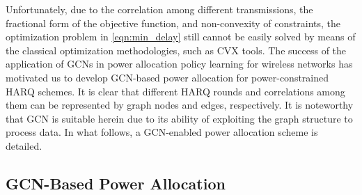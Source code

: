 \documentclass[conference]{IEEEtran}
\begin{document}
Unfortunately, due to the correlation among different transmissions, the fractional form of the objective function, and non-convexity of constraints, the optimization problem in \eqref{eqn:min_delay} still cannot be easily solved by means of the classical optimization methodologies, such as CVX tools. The success of the application of GCNs in power allocation policy learning for wireless networks \cite{9252917} has motivated us to develop GCN-based power allocation for power-constrained HARQ schemes. It is clear that different HARQ rounds and correlations among them can be represented by graph nodes and edges, respectively. %
It is noteworthy that GCN is suitable herein due to its ability of exploiting the graph structure to process data. In what follows, a GCN-enabled power allocation scheme is detailed.
\subsection{GCN-Based Power Allocation}
\end{document}
